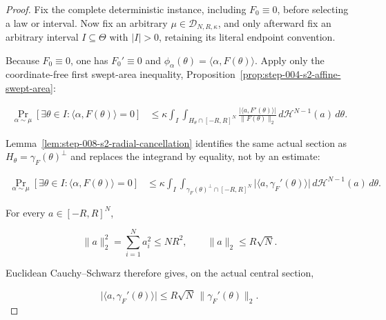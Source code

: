 \begin{proof}
Fix the complete deterministic instance, including \(F_0\equiv0\), before selecting
a law or interval. Now fix an arbitrary \(\mu\in\mathcal D_{N,R,\kappa}\), and only afterward fix an arbitrary
interval \(I\subseteq\Theta\) with \(\lvert I\rvert>0\), retaining its literal endpoint convention.

Because \(F_0\equiv0\), one has \(F_0'\equiv0\) and
\(\phi_\alpha(\theta)=\langle\alpha,F(\theta)\rangle\). Apply only the coordinate-free first
swept-area inequality, Proposition~\ref{prop:step-004-s2-affine-swept-area}:

\begin{equation}
\label{eq:appendix-display-233}
\begin{aligned}
\Pr_{\alpha\sim\mu}
[\exists\theta\in I:\langle\alpha,F(\theta)\rangle=0]
&\leq
\kappa\int_I\int_{H_\theta\cap[-R,R]^N}
\frac{\lvert\langle a,F'(\theta)\rangle\rvert}
{\lVert F(\theta)\rVert_2}
\,d\mathcal H^{N-1}(a)\,d\theta.
\end{aligned}
\end{equation}

Lemma~\ref{lem:step-008-s2-radial-cancellation} identifies the same actual section as
\(H_\theta=\gamma_F(\theta)^\perp\) and replaces the integrand by equality, not by an estimate:

\begin{equation}
\label{eq:appendix-display-234}
\begin{aligned}
\Pr_{\alpha\sim\mu}
[\exists\theta\in I:\langle\alpha,F(\theta)\rangle=0]
&\leq
\kappa\int_I\int_{\gamma_F(\theta)^\perp\cap[-R,R]^N}
\lvert\langle a,\gamma_F'(\theta)\rangle\rvert
\,d\mathcal H^{N-1}(a)\,d\theta.
\end{aligned}
\end{equation}

For every \(a\in[-R,R]^N\),

\begin{equation}
\label{eq:appendix-display-235}
\lVert a\rVert_2^2
=\sum_{i=1}^N a_i^2
\leq NR^2,
\qquad
\lVert a\rVert_2\leq R\sqrt N.
\end{equation}

Euclidean Cauchy--Schwarz therefore gives, on the actual central section,

\begin{equation}
\label{eq:appendix-display-236}
\lvert\langle a,\gamma_F'(\theta)\rangle\rvert
\leq
R\sqrt N\,\lVert\gamma_F'(\theta)\rVert_2.
\end{equation}


\end{proof}
